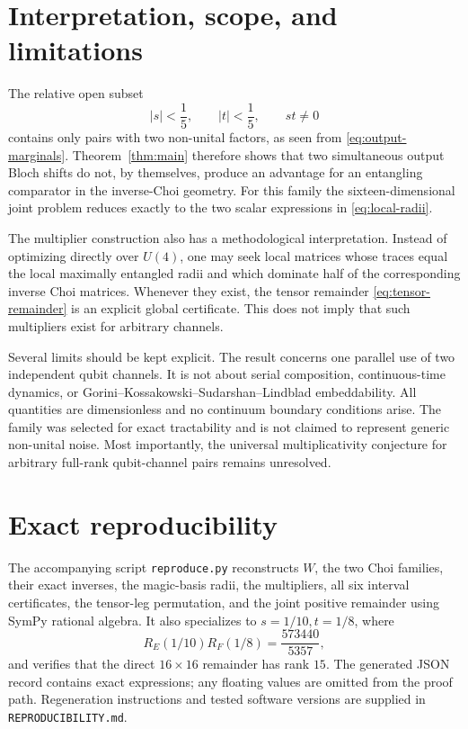 \documentclass[11pt,a4paper]{article}
\theoremstyle{remark}
\begin{document}
\section{Interpretation, scope, and limitations}
\label{sec:interpretation}

The relative open subset
\begin{equation}
 |s|<\frac15,\qquad |t|<\frac15,\qquad st\neq0
\end{equation}
contains only pairs with two non-unital factors, as seen from
\eqref{eq:output-marginals}.  Theorem~\ref{thm:main} therefore shows that two
simultaneous output Bloch shifts do not, by themselves, produce an advantage
for an entangling comparator in the inverse-Choi geometry.  For this family
the sixteen-dimensional joint problem reduces exactly to the two scalar
expressions in \eqref{eq:local-radii}.

The multiplier construction also has a methodological interpretation.
Instead of optimizing directly over $U(4)$, one may seek local matrices whose
traces equal the local maximally entangled radii and which dominate half of
the corresponding inverse Choi matrices.  Whenever they exist, the tensor
remainder \eqref{eq:tensor-remainder} is an explicit global certificate.
This does not imply that such multipliers exist for arbitrary channels.

Several limits should be kept explicit.  The result concerns one parallel
use of two independent qubit channels.  It is not about serial composition,
continuous-time dynamics, or Gorini--Kossakowski--Sudarshan--Lindblad
embeddability.  All quantities are dimensionless and no continuum boundary
conditions arise.  The family was selected for exact tractability and is not
claimed to represent generic non-unital noise.  Most importantly, the
universal multiplicativity conjecture for arbitrary full-rank qubit-channel
pairs remains unresolved.

\section{Exact reproducibility}
\label{sec:reproducibility}

The accompanying script \texttt{reproduce.py} reconstructs $W$, the two Choi
families, their exact inverses, the magic-basis radii, the multipliers, all six
interval certificates, the tensor-leg permutation, and the joint positive
remainder using SymPy rational algebra.  It also specializes to
$s=1/10,t=1/8$, where
\begin{equation}
 R_E(1/10)R_F(1/8)=\frac{573440}{5357},
\end{equation}
and verifies that the direct $16\times16$ remainder has rank $15$.  The
generated JSON record contains exact expressions; any floating values are
omitted from the proof path.  Regeneration instructions and tested software
versions are supplied in \texttt{REPRODUCIBILITY.md}.
\end{document}
